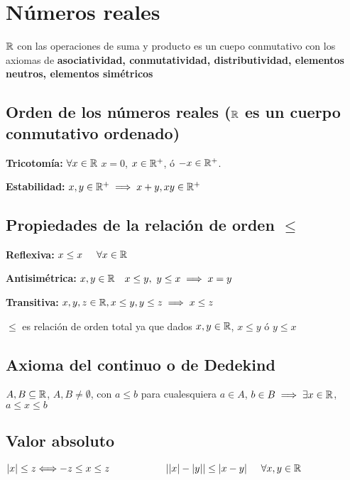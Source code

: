\section{Números reales}
$\mathbb{R}$ con las operaciones de suma y producto es un cuepo conmutativo con los axiomas de 
\textbf{asociatividad, conmutatividad, distributividad, elementos neutros, elementos simétricos}

\subsection{Orden de los números reales ($\mathbb{R}$ es un cuerpo conmutativo ordenado)}
\textbf{Tricotomía:} $\forall x \in \mathbb{R}$ $x=0$, $x\in\mathbb{R}^+$, ó $-x\in\mathbb{R}^+$.

\textbf{Estabilidad:} $x,y\in\mathbb{R}^+ \implies x+y,xy\in\mathbb{R}^+$


\subsection{Propiedades de la relación de orden $\leq$}
\textbf{Reflexiva:} $x\leq x \hspace{0.5cm}\forall x \in \mathbb{R}$

\textbf{Antisimétrica:} $x,y\in\R\ \ \ x\leq y, \ y\leq x \implies x=y$

\textbf{Transitiva:} $x,y,z\in\mathbb{R}, x\leq y, y\leq z \implies x\leq z$

$\leq$ es relación de orden total ya que dados $x,y	\in\mathbb{R}$, $x\leq y$ ó $y\leq x$


\subsection{Axioma del continuo o de Dedekind}
$A,B\subseteq \mathbb{R}$, $A,B\not = \emptyset$, con $a\leq b$ para cualesquiera $a\in A$, $b\in B \implies \exists x\in\mathbb{R}$, $a\leq x \leq b$


\subsection{Valor absoluto}
\begin{center}
$ |x|\leq z \Longleftrightarrow -z\leq x\leq z \hspace{2cm} ||x|-|y||\leq |x-y| \hspace{0.5cm} \forall x,y\in\mathbb{R} $	
\end{center}
